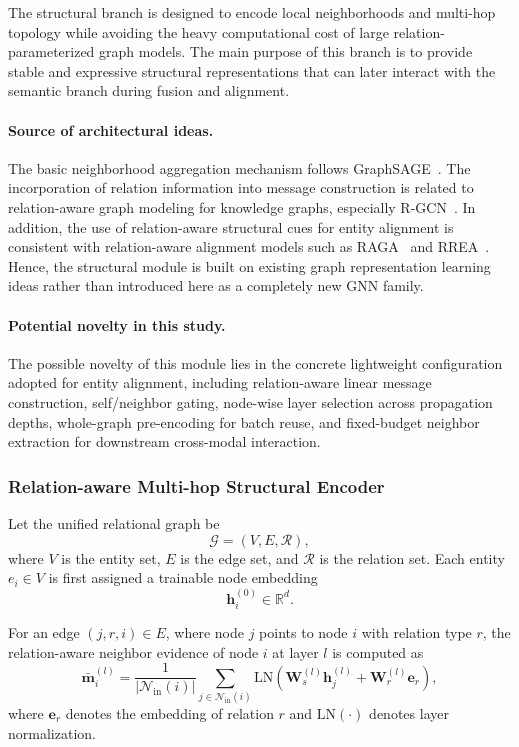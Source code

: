 The structural branch is designed to encode local neighborhoods and multi-hop topology while avoiding the heavy computational cost of large relation-parameterized graph models. The main purpose of this branch is to provide stable and expressive structural representations that can later interact with the semantic branch during fusion and alignment.

\paragraph{Source of architectural ideas.}
The basic neighborhood aggregation mechanism follows GraphSAGE~\cite{hamilton2017graphsage}. The incorporation of relation information into message construction is related to relation-aware graph modeling for knowledge graphs, especially R-GCN~\cite{schlichtkrull2018rgcn}. In addition, the use of relation-aware structural cues for entity alignment is consistent with relation-aware alignment models such as RAGA~\cite{zhu2021raga} and RREA~\cite{mao2020rrea}. Hence, the structural module is built on existing graph representation learning ideas rather than introduced here as a completely new GNN family.

\paragraph{Potential novelty in this study.}
The possible novelty of this module lies in the concrete lightweight configuration adopted for entity alignment, including relation-aware linear message construction, self/neighbor gating, node-wise layer selection across propagation depths, whole-graph pre-encoding for batch reuse, and fixed-budget neighbor extraction for downstream cross-modal interaction.

\subsubsection{Relation-aware Multi-hop Structural Encoder}

Let the unified relational graph be
\[
\mathcal{G}=(V,E,\mathcal{R}),
\]
where $V$ is the entity set, $E$ is the edge set, and $\mathcal{R}$ is the relation set. Each entity $e_i \in V$ is first assigned a trainable node embedding
\[
\mathbf{h}_i^{(0)} \in \mathbb{R}^{d}.
\]

For an edge $(j,r,i) \in E$, where node $j$ points to node $i$ with relation type $r$, the relation-aware neighbor evidence of node $i$ at layer $l$ is computed as
\begin{equation}
\bar{\mathbf{m}}_{i}^{(l)}
=
\frac{1}{|\mathcal{N}_{\mathrm{in}}(i)|}
\sum_{j \in \mathcal{N}_{\mathrm{in}}(i)}
\mathrm{LN}
\left(
\mathbf{W}_{s}^{(l)}\mathbf{h}_{j}^{(l)}
+
\mathbf{W}_{r}^{(l)}\mathbf{e}_{r}
\right),
\end{equation}
where $\mathbf{e}_{r}$ denotes the embedding of relation $r$ and $\mathrm{LN}(\cdot)$ denotes layer normalization.

